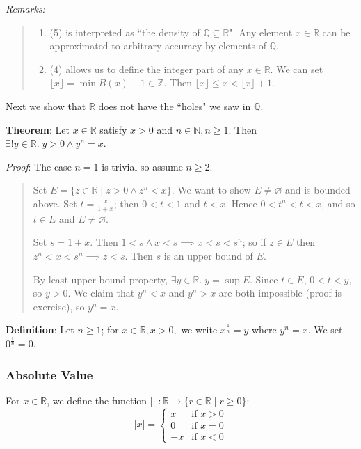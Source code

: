 \documentclass[11pt]{article}
\begin{document}
\emph{Remarks:}
\begin{quote}\vspace{-0.3cm}
	\begin{enumerate}
	\item (5) is interpreted as ``the density of $\mathbb{Q} \subseteq \mathbb{R}$". Any element $x \in \mathbb{R}$ can be approximated to arbitrary accuracy by elements of $\mathbb{Q}$.
	\item (4) allows us to define the integer part of any $x \in \mathbb{R}$. We can set $\lfloor x \rfloor = \min B(x) - 1 \in \mathbb{Z}$. Then $\lfloor x \rfloor \leq x < \lfloor x \rfloor + 1$.
	\end{enumerate}
\end{quote}

Next we show that $\mathbb{R}$ does not have the ``holes" we saw in $\mathbb{Q}$.

\textbf{Theorem}: Let $x \in \mathbb{R}$ satisfy $x > 0$ and $n \in \mathbb{N}, n \geq 1$. Then $\exists ! y \in \mathbb{R}.\; y > 0 \land y^n = x$.

\emph{Proof}: The case $n = 1$ is trivial so assume $n \geq 2$.
\begin{quote}\vspace{-0.3cm}
Set $E = \{z \in \mathbb{R} \mid z > 0 \land z^n < x\}$. We want to show $E \neq \varnothing$ and is bounded above. Set $t = \frac{x}{1+x}$; then $0 < t < 1$ and $t < x$. Hence $0 < t^n < t < x$, and so $t \in E$ and $E \neq \varnothing$.

Set $s = 1+x$. Then $1 < s \land x < s \implies x < s < s^n$; so if $z \in E$ then $z^n < x < s^n \implies z < s$. Then $s$ is an upper bound of $E$.

By least upper bound property, $\exists y \in \mathbb{R}.\; y = \sup E$. Since $t \in E$, $0 < t < y$, so $y > 0$. We claim that $y^n < x$ and $y^n > x$ are both impossible (proof is exercise), so $y^n = x$.
\end{quote}

\textbf{Definition}: Let $n \geq 1$; for $x \in \mathbb{R}, x > 0,$ we write $x^{\frac{1}{n}} = y$ where $y^n = x$. We set $0^{\frac{1}{n}} = 0$.


\subsubsection{Absolute Value}

For $x \in \mathbb{R}$, we define the function $|\cdot| : \mathbb{R} \to \{r \in \mathbb{R} \mid r \geq 0\}$:
\[
 |x| =
  \begin{cases}
   x & \text{if } x > 0\\
   0 & \text{if } x = 0\\
  -x & \text{if } x < 0
  \end{cases}
\]
\end{document}
